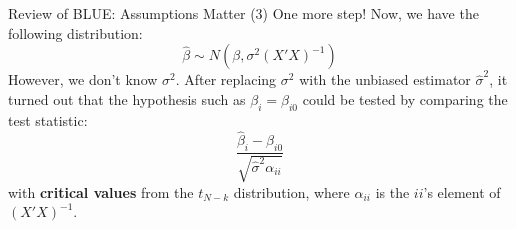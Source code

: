 \documentclass[aspectratio=169, t]{beamer}
\begin{document}
\begin{frame}{Review of BLUE: Assumptions Matter (3)}
    One more step! Now, we have the following distribution:
    \begin{equation*}
        \hat{\beta} \sim N(\beta, \sigma^2(X'X)^{-1})
    \end{equation*}
    However, we don't know $\sigma^2$. After replacing $\sigma^2$ with the
    unbiased estimator $\hat{\sigma}^2$, it turned out that the hypothesis such as
    $\beta_i = \beta_{i0}$ could be tested by comparing the test statistic:
    \begin{equation*}
        \frac{\hat{\beta}_i - \beta_{i0}}{\sqrt{\hat{\sigma}^2\alpha_{ii}}}
    \end{equation*}
    with \textbf{critical values} from the $t_{N-k}$ distribution, where $\alpha_{ii}$
    is the $ii$'s element of $(X'X)^{-1}$. 
\end{frame}
\end{document}
